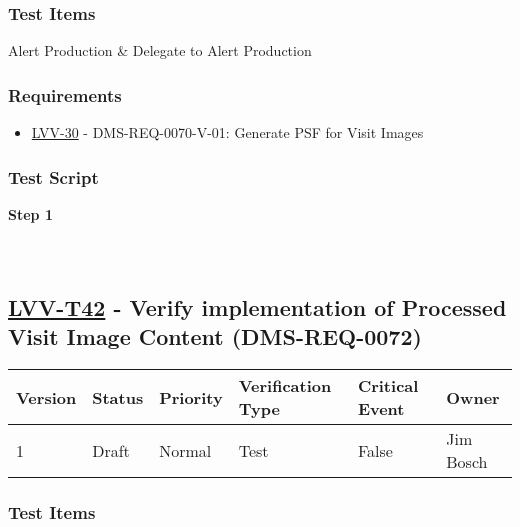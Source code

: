 \hypertarget{test-items-17}{%
\subsubsection{Test Items}\label{test-items-17}}

Alert Production \& Delegate to Alert Production

\hypertarget{requirements-18}{%
\subsubsection{Requirements}\label{requirements-18}}

\begin{itemize}
\tightlist
\item
  \href{https://jira.lsstcorp.org/browse/LVV-30}{LVV-30} -
  DMS-REQ-0070-V-01: Generate PSF for Visit Images
\end{itemize}

\hypertarget{test-script-18}{%
\subsubsection{Test Script}\label{test-script-18}}

\textbf{Step 1}\\
~\\
~\\

\hypertarget{lvv-t42---verify-implementation-of-processed-visit-image-content-dms-req-0072}{%
\subsection{\texorpdfstring{\href{https://jira.lsstcorp.org/secure/Tests.jspa\#/testCase/LVV-T42}{LVV-T42}
- Verify implementation of Processed Visit Image Content
(DMS-REQ-0072)}{LVV-T42 - Verify implementation of Processed Visit Image Content (DMS-REQ-0072)}}\label{lvv-t42---verify-implementation-of-processed-visit-image-content-dms-req-0072}}

\begin{longtable}[]{@{}llllll@{}}
\toprule
Version & Status & Priority & Verification Type & Critical Event &
Owner\tabularnewline
\midrule
\endhead
1 & Draft & Normal & Test & False & Jim Bosch\tabularnewline
\bottomrule
\end{longtable}

\hypertarget{test-items-18}{%
\subsubsection{Test Items}\label{test-items-18}}

